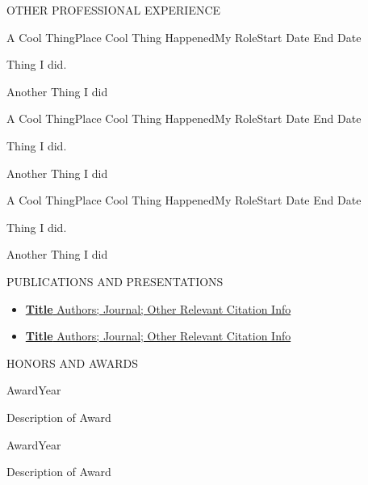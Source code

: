 \documentclass{resume} %
\begin{document}
\begin{rSection}{OTHER PROFESSIONAL EXPERIENCE }

\begin{rSubsection}{A Cool Thing}{Place Cool Thing Happened}{My Role}{Start Date {\textendash} End Date}
\item Thing I did.
\item Another Thing I did
\end{rSubsection}

\begin{rSubsection}{A Cool Thing}{Place Cool Thing Happened}{My Role}{Start Date {\textendash} End Date}
\item Thing I did.
\item Another Thing I did
\end{rSubsection}


\begin{rSubsection}{A Cool Thing}{Place Cool Thing Happened}{My Role}{Start Date {\textendash} End Date}
\item Thing I did.
\item Another Thing I did
\end{rSubsection}

\end{rSection}

\begin{rSection}{PUBLICATIONS AND PRESENTATIONS} 
\begin{itemize}[leftmargin={0 pt}, label={}, topsep=0pt]

\item \href{Paper Web Link}{\textbf{Title}  
Authors;
Journal; Other Relevant Citation Info }

\item \href{Paper Web Link}{\textbf{Title}  
Authors;
Journal; Other Relevant Citation Info }

\end{itemize}
\end{rSection}
\begin{rSection}{HONORS AND AWARDS}

\begin{rSubsection}
{Award}{Year}{}{}
\item Description of Award
\end{rSubsection}


\begin{rSubsection}
{Award}{Year}{}{}
\item Description of Award
\end{rSubsection}




\end{rSection}
\end{document}
